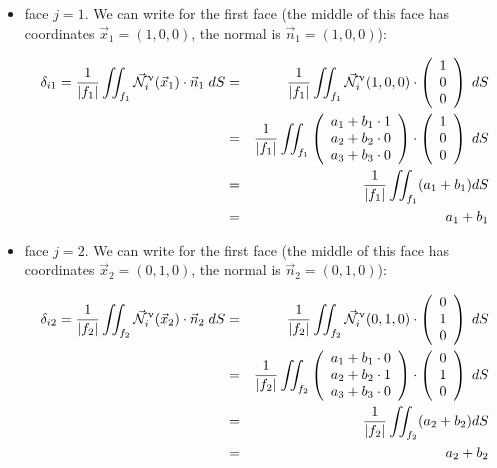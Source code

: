 \begin{itemize}
\item face $j=1$. We can write for the first face (the middle of this face has coordinates 
$\vec{x}_1=(1,0,0)$, the normal is $\vec{n}_1=(1,0,0)$):


\begin{eqnarray}
\delta_{i1}=
\frac{1}{|f_1|} \iint_{f_1}
\vec{{\mathcal{N}}}^\upnu_i( \vec{x}_1) \cdot \vec{n}_1 \; dS
&=&\frac{1}{|f_1|} \iint_{f_1} \vec{{\mathcal{N}}}^\upnu_i( 1,0,0) \cdot 
\left(\begin{array}{c} 1 \\ 0  \\ 0\end{array}\right) \; dS \nonumber\\
&=& \frac{1}{|f_1|} \iint_{f_1} 
\left(\begin{array}{c} a_1+b_1\cdot 1 \\ a_2 + b_2 \cdot 0 \\ a_3 + b_3\cdot 0 \end{array}\right)
\cdot \left(\begin{array}{c} 1 \\ 0 \\ 0 \end{array}\right) \; dS \nonumber\\
&=& \frac{1}{|f_1|} \iint_{f_1} (a_1+b_1) dS \nonumber\\
&=& a_1+b_1
\end{eqnarray}


\item face $j=2$. We can write for the first face (the middle of this face has coordinates 
$\vec{x}_2=(0,1,0)$, the normal is $\vec{n}_2=(0,1,0)$):

\begin{eqnarray}
\delta_{i2}=
\frac{1}{|f_2|} \iint_{f_2}
\vec{{\mathcal{N}}}^\upnu_i( \vec{x}_2) \cdot \vec{n}_2 \; dS
&=&\frac{1}{|f_2|} \iint_{f_2} \vec{{\mathcal{N}}}^\upnu_i( 0,1,0) \cdot 
\left(\begin{array}{c} 0 \\ 1  \\ 0\end{array}\right) \; dS \nonumber\\
&=& \frac{1}{|f_2|} \iint_{f_2} 
\left(\begin{array}{c} a_1+b_1\cdot 0 \\ a_2 + b_2 \cdot 1 \\ a_3 + b_3\cdot 0 \end{array}\right)
\cdot \left(\begin{array}{c} 0 \\ 1 \\ 0 \end{array}\right) \; dS \nonumber\\
&=& \frac{1}{|f_2|} \iint_{f_2} (a_2+b_2) dS \nonumber\\
&=& a_2+b_2
\end{eqnarray}



\end{itemize}
